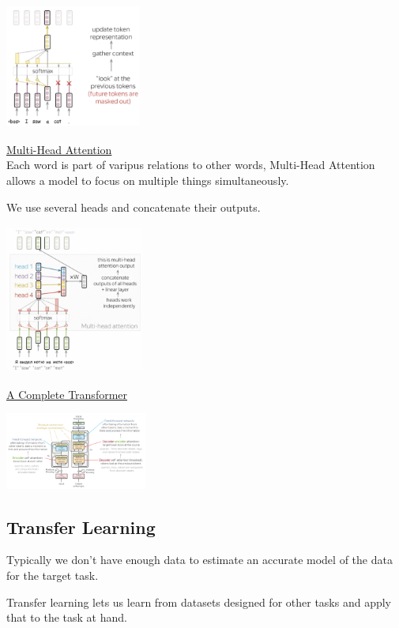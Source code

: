 \documentclass[8pt]{extarticle} %
\begin{document}
\begin{multicols*}{3}
\begin{center}
    \includegraphics[width=0.35\textwidth]{media/masking.png}
\end{center}

\underline{Multi-Head Attention}\\

Each word is part of varipus relations to other words, 
Multi-Head Attention allows a model to focus on multiple things simultaneously. 

We use several heads and concatenate their outputs.
\begin{center}
    \includegraphics[width=0.35\textwidth]{media/multi-heaf.png}
\end{center}

\underline{A Complete Transformer}
\begin{center}
    \includegraphics[width=0.35\textwidth]{media/transformer.png}
\end{center}

\subsection*{Transfer Learning}
Typically we don't have enough data to estimate an accurate model of the data for the target task.

Transfer learning lets us learn from datasets designed for other tasks and apply that to the task at hand.


\end{multicols*}
\end{document}
